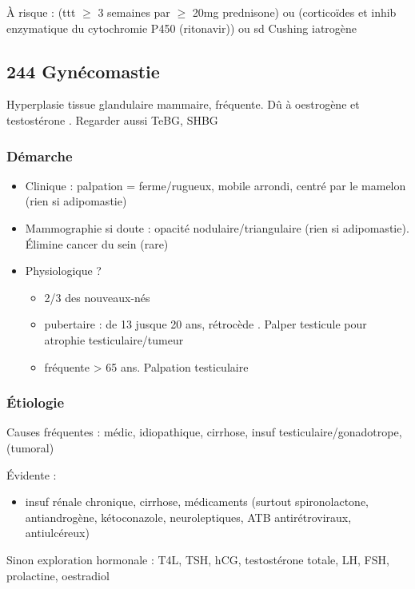 \documentclass[11pt]{article}
\begin{document}
À risque : (ttt \(\ge\) 3 semaines par \(\ge\) 20mg prednisone) ou (corticoïdes et inhib enzymatique du
cytochromie P450 (ritonavir)) ou sd Cushing iatrogène
\subsection{244 \textdagger{} Gynécomastie}
\label{sec:orgf9fa618}
Hyperplasie tissue glandulaire mammaire, fréquente. Dû à oestrogène \inc{} et testostérone \dec{}. Regarder aussi TeBG,
SHBG
\subsubsection{Démarche}
\label{sec:org4c24cfc}
\begin{itemize}
\item Clinique : palpation = ferme/rugueux, mobile arrondi, centré par le mamelon (rien si adipomastie)
\item Mammographie si doute : opacité nodulaire/triangulaire (rien si adipomastie). Élimine cancer du sein (rare)
\item Physiologique ? 
\begin{itemize}
\item 2/3 des nouveaux-nés
\item pubertaire : de 13 jusque 20 ans, rétrocède . Palper testicule pour atrophie testiculaire/tumeur
\item fréquente > 65 ans. Palpation testiculaire
\end{itemize}
\end{itemize}
\subsubsection{Étiologie}
\label{sec:org9b1b94a}
\begin{tcolorbox}
Causes fréquentes : médic, idiopathique, cirrhose, insuf testiculaire/gonadotrope, (tumoral)
\end{tcolorbox}
Évidente :
\begin{itemize}
\item insuf rénale chronique, cirrhose, médicaments (surtout spironolactone,
antiandrogène, kétoconazole, neuroleptiques, ATB antirétroviraux, antiulcéreux)
\end{itemize}
Sinon exploration hormonale : T4L, TSH, hCG, testostérone totale, LH, FSH,
prolactine, oestradiol
\end{document}
